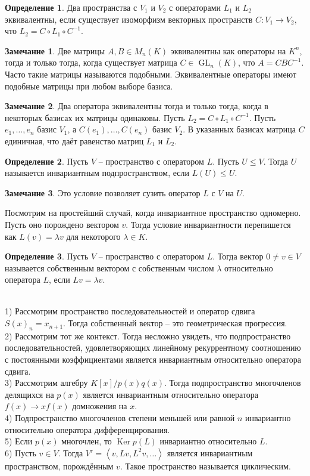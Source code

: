 \documentclass[10pt,a4paper,oneside]{book} %
\theoremstyle{definition}
\newtheorem*{rem}{Замечание}
\newtheorem*{defn}{Определение}
\DeclareMathOperator{\Ker}{Ker}
\newcommand{\GL}{\operatorname{GL}}
\def\exm{\noindent {\bf Примеры:}}
\def\lan{\left\langle }
\def\ran{\right\rangle}
\def\dfn{\begin{defn}}
\def\edfn{\end{defn}}
\def\rm{\begin{rem}}
\def\erm{\end{rem}}
\begin{document}
\dfn Два пространства с $V_1$ и $V_2$ с операторами $L_1$ и $L_2$ эквивалентны, если существует изоморфизм векторных пространств $C \colon V_1 \to V_2$, что $L_2=C \circ L_1 \circ C^{-1}$.
\edfn


\rm Две матрицы $A, B \in M_n(K)$ эквивалентны как операторы на $K^n$, тогда и только тогда, когда существует матрица $C \in \GL_n(K)$, что $A=CBC^{-1}$. Часто такие матрицы называются подобными. Эквивалентные операторы имеют подобные матрицы при любом выборе базиса.
\erm

\rm Два оператора эквивалентны тогда и только тогда, когда в некоторых базисах их матрицы одинаковы.
\proof Пусть $L_2=C \circ L_1 \circ C^{-1}$. Пусть $e_1,\dots,e_n$ базис $V_1$, а $C(e_1),\dots,C(e_n)$ базис $V_2$. В указанных базисах матрица $C$ единичная, что даёт равенство матриц $L_1$ и $L_2$.
\endproof
\erm


\dfn Пусть $V$ -- пространство с оператором $L$. Пусть $U\leq V$. Тогда $U$ называется инвариантным подпространством, если $L(U) \leq U$.
\edfn

\rm Это условие позволяет сузить оператор $L$ с $V$ на $U$.
\erm

Посмотрим на простейший случай, когда инвариантное пространство одномерно. Пусть оно порождено вектором $v$. Тогда условие инвариантности перепишется как $L(v) = \lambda v$ для некоторого $\lambda \in K$.


\dfn Пусть $V$ -- пространство с оператором $L$. Тогда вектор $0\neq v\in V$ называется собственным вектором с собственным числом $\lambda$ относительно оператора $L$, если $Lv=\lambda v$.
\edfn

\exm \\
1) Рассмотрим пространство  последовательностей и оператор сдвига $S(x)_n= x_{n+1}$. Тогда собственный вектор -- это геометрическая прогрессия.\\
2) Рассмотрим тот же контекст. Тогда несложно увидеть, что подпространство последовательностей, удовлетворяющих линейному рекуррентному соотношению с постоянными коэффициентами является инвариантным относительно оператора сдвига.\\
3) Рассмотрим алгебру $K[x]/p(x)q(x)$. Тогда подпространство многочленов делящихся на $p(x)$ является инвариантным относительно оператора $f(x) \to x f(x)$ домножения на $x$.\\
4) Подпространство многочленов степени меньшей или равной $n$ инвариантно относительно оператора дифференцирования.\\
5) Если $p(x)$ многочлен, то $\Ker p(L)$ инвариантно относительно $L$.\\
6) Пусть $v \in V$. Тогда  $V'=\lan v, Lv, L^2v,\dots \ran$ является инвариантным пространством, порождённым $v$. Такое пространство называется циклическим.\\
\end{document}
